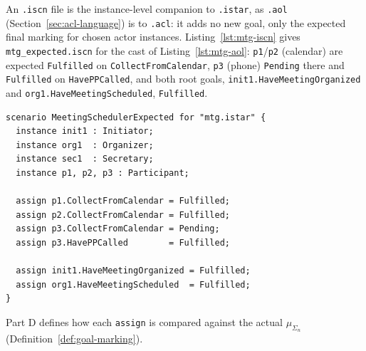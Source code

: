 %
%

An \texttt{.iscn} file is the instance-level companion to \texttt{.istar}, as \texttt{.aol} (Section~\ref{sec:acl-language}) is to \texttt{.acl}: it adds no new goal, only the expected final marking for chosen actor instances. Listing~\ref{lst:mtg-iscn} gives \texttt{mtg\_expected.iscn} for the cast of Listing~\ref{lst:mtg-aol}: \texttt{p1}/\texttt{p2} (calendar) are expected \texttt{Fulfilled} on \texttt{CollectFromCalendar}, \texttt{p3} (phone) \texttt{Pending} there and \texttt{Fulfilled} on \texttt{HavePPCalled}, and both root goals, \texttt{init1.HaveMeetingOrganized} and \texttt{org1.HaveMeetingScheduled}, \texttt{Fulfilled}.

\begin{lstlisting}[basicstyle=\ttfamily\scriptsize,frame=single,breaklines=true,caption={Expected final marking in \texttt{mtg\_expected.iscn}.},label={lst:mtg-iscn}]
scenario MeetingSchedulerExpected for "mtg.istar" {
  instance init1 : Initiator;
  instance org1  : Organizer;
  instance sec1  : Secretary;
  instance p1, p2, p3 : Participant;

  assign p1.CollectFromCalendar = Fulfilled;
  assign p2.CollectFromCalendar = Fulfilled;
  assign p3.CollectFromCalendar = Pending;
  assign p3.HavePPCalled        = Fulfilled;

  assign init1.HaveMeetingOrganized = Fulfilled;
  assign org1.HaveMeetingScheduled  = Fulfilled;
}
\end{lstlisting}

Part D defines how each \texttt{assign} is compared against the actual $\mu_{\Sigma_n}$ (Definition~\ref{def:goal-marking}).
